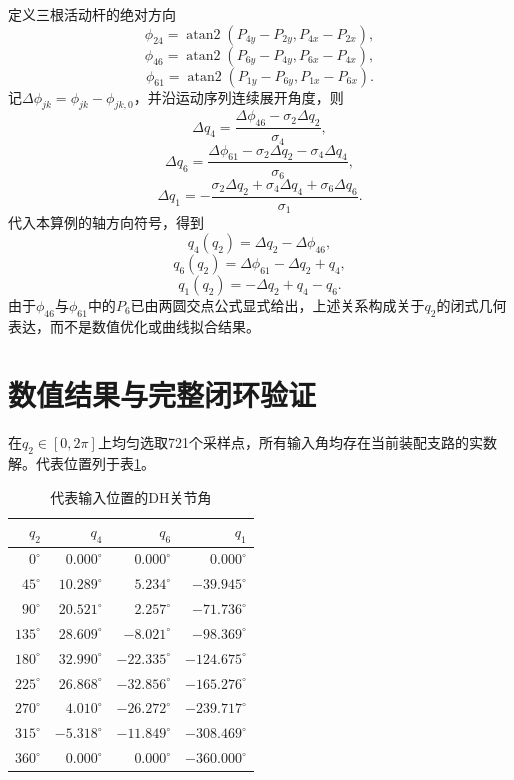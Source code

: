 \documentclass[UTF8,12pt,a4paper]{ctexart}
\begin{document}
定义三根活动杆的绝对方向
\[
\phi_{24}=\operatorname{atan2}(P_{4y}-P_{2y},P_{4x}-P_{2x}),
\]
\[
\phi_{46}=\operatorname{atan2}(P_{6y}-P_{4y},P_{6x}-P_{4x}),
\]
\[
\phi_{61}=\operatorname{atan2}(P_{1y}-P_{6y},P_{1x}-P_{6x}).
\]
记$\Delta\phi_{jk}=\phi_{jk}-\phi_{jk,0}$，并沿运动序列连续展开角度，则
\[
\Delta q_4=\frac{\Delta\phi_{46}-\sigma_2\Delta q_2}{\sigma_4},
\]
\[
\Delta q_6=\frac{\Delta\phi_{61}-\sigma_2\Delta q_2-\sigma_4\Delta q_4}{\sigma_6},
\]
\[
\Delta q_1=-\frac{\sigma_2\Delta q_2+\sigma_4\Delta q_4+\sigma_6\Delta q_6}{\sigma_1}.
\]
代入本算例的轴方向符号，得到
\[
q_4(q_2)=\Delta q_2-\Delta\phi_{46},
\]
\[
q_6(q_2)=\Delta\phi_{61}-\Delta q_2+q_4,
\]
\[
q_1(q_2)=-\Delta q_2+q_4-q_6.
\]
由于$\phi_{46}$与$\phi_{61}$中的$P_6$已由两圆交点公式显式给出，上述关系构成关于$q_2$的闭式几何表达，而不是数值优化或曲线拟合结果。

\section{数值结果与完整闭环验证}

在$q_2\in[0,2\pi]$上均匀选取721个采样点，所有输入角均存在当前装配支路的实数解。代表位置列于表\ref{tab:result}。

\begin{table}[H]
\centering
\caption{代表输入位置的DH关节角}
\label{tab:result}
\begin{tabular}{rrrr}
\toprule
$q_2$ & $q_4$ & $q_6$ & $q_1$\\
\midrule
$0^\circ$   & $0.000^\circ$ & $0.000^\circ$ & $0.000^\circ$\\
$45^\circ$  & $10.289^\circ$ & $5.234^\circ$ & $-39.945^\circ$\\
$90^\circ$  & $20.521^\circ$ & $2.257^\circ$ & $-71.736^\circ$\\
$135^\circ$ & $28.609^\circ$ & $-8.021^\circ$ & $-98.369^\circ$\\
$180^\circ$ & $32.990^\circ$ & $-22.335^\circ$ & $-124.675^\circ$\\
$225^\circ$ & $26.868^\circ$ & $-32.856^\circ$ & $-165.276^\circ$\\
$270^\circ$ & $4.010^\circ$ & $-26.272^\circ$ & $-239.717^\circ$\\
$315^\circ$ & $-5.318^\circ$ & $-11.849^\circ$ & $-308.469^\circ$\\
$360^\circ$ & $0.000^\circ$ & $0.000^\circ$ & $-360.000^\circ$\\
\bottomrule
\end{tabular}
\end{table}
\end{document}
